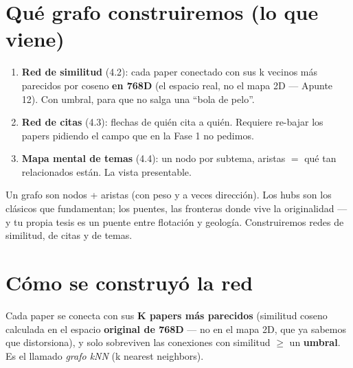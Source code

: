 \documentclass[11pt,a4paper]{article}
\begin{document}
\section{Qué grafo construiremos (lo que viene)}

\begin{enumerate}
  \item \textbf{Red de similitud} (4.2): cada paper conectado con sus k vecinos más parecidos
        por coseno \textbf{en 768D} (el espacio real, no el mapa 2D — Apunte 12). Con umbral,
        para que no salga una ``bola de pelo''.
  \item \textbf{Red de citas} (4.3): flechas de quién cita a quién. Requiere re-bajar los
        papers pidiendo el campo  que en la Fase 1 no pedimos.
  \item \textbf{Mapa mental de temas} (4.4): un nodo por subtema, aristas $=$ qué tan
        relacionados están. La vista presentable.
\end{enumerate}

\begin{resumen}
Un grafo son nodos + aristas (con peso y a veces dirección). Los hubs son los clásicos que
fundamentan; los puentes, las fronteras donde vive la originalidad — y tu propia tesis es un
puente entre flotación y geología. Construiremos redes de similitud, de citas y de temas.
\end{resumen}
\clearpage
{}
{}

\section{Cómo se construyó la red}

Cada paper se conecta con sus \textbf{K papers más parecidos} (similitud coseno calculada en
el espacio \textbf{original de 768D} — no en el mapa 2D, que ya sabemos que distorsiona), y
solo sobreviven las conexiones con similitud $\geq$ un \textbf{umbral}. Es el llamado
\emph{grafo kNN} (k nearest neighbors).
\end{document}

